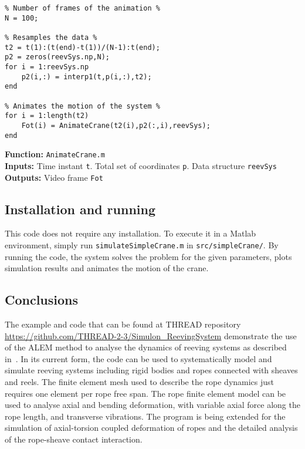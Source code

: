{\begin{tcolorbox}\begin{lstlisting}[style=Matlab-editor]
% Animation of crane motion %
% Number of frames of the animation %
N = 100;

% Resamples the data %
t2 = t(1):(t(end)-t(1))/(N-1):t(end);
p2 = zeros(reevSys.np,N);
for i = 1:reevSys.np
    p2(i,:) = interp1(t,p(i,:),t2);
end

% Animates the motion of the system %
for i = 1:length(t2)
    Fot(i) = AnimateCrane(t2(i),p2(:,i),reevSys);
end
\end{lstlisting}\end{tcolorbox}}


\setlength{\parindent}{0cm}
\textbf{Function:} \texttt{AnimateCrane.m} \\
\textbf{Inputs:} Time instant \texttt{t}. Total set of coordinates \texttt{p}. Data structure \texttt{reevSys} \\
\textbf{Outputs:} Video frame \texttt{Fot} \\


\subsection{Installation and running}
 This code does not require any installation. To execute it in a Matlab environment, simply run \texttt{simulateSimpleCrane.m} in \texttt{src/simpleCrane/}. By running the code, the system solves the problem for the given parameters, plots simulation results and animates the motion of the crane. 

\subsection{Conclusions}
The example and code that can be found at THREAD repository \url{https://github.com/THREAD-2-3/Simulon_ReevingSystem} demonstrate the use of the ALEM method to analyse the dynamics of reeving systems as described in~\cite{EscalonaOrzechowskiMikkola2018}. In its current form, the code can be used to systematically model and simulate reeving systems including rigid bodies and ropes connected with sheaves and reels. The finite element mesh used to describe the rope dynamics just requires one element per rope free span. The rope finite element model can be used to analyse axial and bending deformation, with variable axial force along the rope length, and transverse vibrations. 
The program is being extended for the simulation of axial-torsion coupled deformation of ropes and the detailed analysis of the rope-sheave contact interaction.



